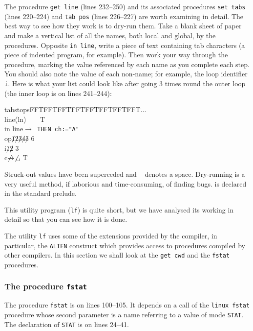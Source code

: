 The procedure \verb|get line| (lines 232--250) and its associated
procedures \verb|set tabs| (lines 220--224) and \verb|tab pos| (lines
226--227) are worth examining in detail.  The best way to see how
they work is to dry-run them.  Take a blank sheet of paper and make a
vertical list of all the names, both local and global,
 by the procedures. Opposite \verb|in line|,
write a piece of text containing tab characters (a piece of indented
program, for example).  Then work your way through the procedure,
marking the value referenced by each name as you complete each step.
You should also note the value of each non-name; for example, the
loop identifier \verb|i|.  Here is what your list could look like
after going 3 times round the outer loop (the inner loop is on lines
241--244):
\smallskip
\begin{tabbing}
\ttfamily
\quad\=tabstops\quad\=FFTFFTFFTFFTFFTFFTFFTFFT$\ldots$\\
\>line(ln)\>\verb*|    |T\\
\>in line\>$\rightarrow$\verb*| THEN ch:="A"|\\
\>op\>$\not1\not2\not3\not4\not5$ 6\\
\>i\>$\not1\not2$ 3\\
\>c\>$\not\rightarrow\not\hbox{\verb*| |}$ T
\end{tabbing}
\smallskip
\noindent Struck-out values have been superceded and \verb*| |
denotes a space. Dry-running is a very useful method, if laborious
and time-consuming, of finding bugs.  is declared in the
standard prelude.

This utility program (\verb|lf|) is quite short, but we have analysed
its working in detail so that you can see how it is done.

The utility \verb|lf| uses some of the extensions provided by the
 compiler, in particular, the
\verb|ALIEN| construct which provides access to procedures compiled
by other compilers. In this section we shall look at the
\verb|get cwd| and the \verb|fstat| procedures.

\subsubsection{The procedure \texttt{fstat}}
The procedure \verb|fstat| is on lines 100--105. It depends on a call
of the \verb|linux fstat| procedure whose second parameter is a name
referring to a value of mode \verb|STAT|. The declaration of
\verb|STAT| is on lines 24--41.

